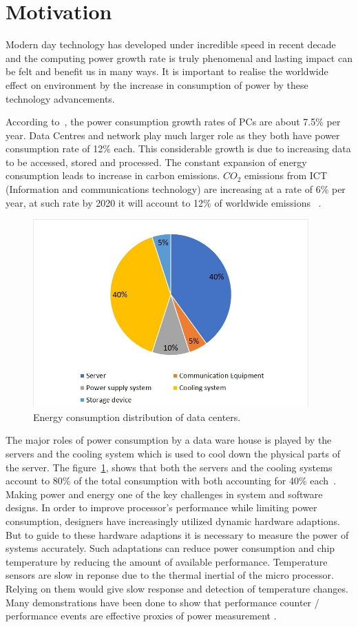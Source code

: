 \section{Motivation}
Modern day technology has developed under incredible speed in recent decade and the computing power growth rate is truly phenomenal and lasting impact can be felt and benefit us in many ways. It is important to realise the worldwide effect on environment by the increase in consumption of power by these technology advancements.

According to~\cite{pickavet2008worldwide}, the power consumption growth rates of PCs are about 7.5\% per year. Data Centres and network play much larger role as they both have power consumption rate of 12\% each. This considerable growth is due to increasing data to be accessed, stored and processed. The constant expansion of energy consumption leads to increase in carbon emissions. \(CO_2\) emissions from ICT (Information and communications technology) are increasing at a rate of 6\% per year, at such rate by 2020 it will account to 12\% of worldwide emissions ~\cite{rong2016optimizing}.

\begin{figure}[ht]
	\centering
	\includegraphics[width=300pt]{energypiechart}
	\caption{\label{fig:energypie} Energy consumption distribution of data centers.}
\end{figure}

The major roles of power consumption by a data ware house is played by the servers and the cooling system which is used to cool down the physical parts of the server. The figure~\ref{fig:energypie}, shows that both the servers and the cooling systems account to 80\% of the total consumption with both accounting for 40\% each~\cite{rong2016optimizing}. Making power and energy one of the key challenges in system and software designs. In order to improve processor's performance while limiting power consumption, designers have increasingly utilized dynamic hardware adaptions. But to guide to these hardware adaptions it is necessary to measure the power of systems accurately. Such adaptations can reduce power consumption and chip temperature by reducing the amount of available performance. Temperature sensors are slow in reponse due to the thermal inertial of the micro processor. Relying on them would give slow response and detection of temperature changes. Many demonstrations have been done to show that performance counter / performance events are effective proxies of power measurement \cite{bellosa2000benefits}.


